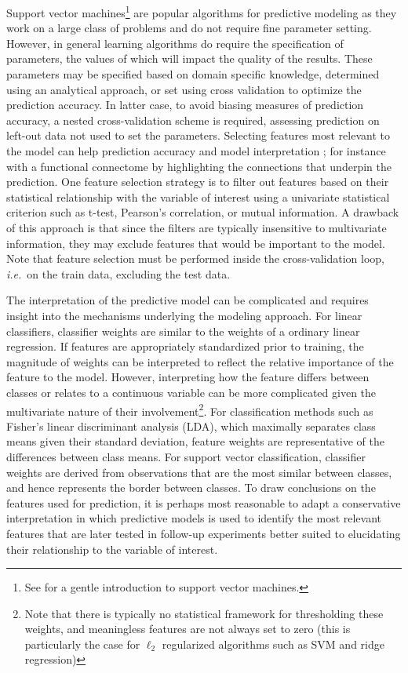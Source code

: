 \documentclass[5p]{elsarticle}
\begin{document}
Support vector machines\footnote{See \cite{kloppel2008}
for a gentle introduction to support vector machines.} are popular
algorithms for predictive modeling as they work on a large class of problems 
and do not require fine parameter setting.
However, in general learning algorithms do require the specification of
parameters, the values of which will impact the quality of the results.
These parameters may be specified based on domain specific knowledge,
determined using an analytical approach, or set using
cross validation to optimize the prediction accuracy. In latter case, 
to avoid biasing measures of prediction accuracy, a
nested cross-validation scheme \cite{pereira2009} is required, assessing 
prediction on left-out data not used to set the parameters.
%
Selecting features most relevant to the model can help prediction
accuracy and model interpretation \cite{pereira2009}; for instance with a
functional connectome by highlighting the connections that underpin the
prediction. One feature selection strategy is 
to filter out features
based on their statistical relationship with the variable of interest
using a univariate statistical criterion such as t-test, Pearson's
correlation, or mutual information.  A drawback of this approach is that
since the filters are typically insensitive to multivariate
information, they may exclude features that would be important to the
model. Note that feature selection must be performed inside the
cross-validation loop, \emph{i.e.}\ on the train data, excluding the test
data.


The interpretation of the predictive model can be complicated and
requires insight into the mechanisms
underlying the modeling approach. For linear classifiers, 
classifier weights are similar to the weights of a ordinary linear regression.
If features are appropriately
standardized prior to training, the magnitude of weights can be
interpreted to reflect the relative importance of the feature to the
model. However, interpreting how the feature differs between classes or
relates to a continuous variable can be more complicated given
the multivariate nature of their involvement\footnote{Note that there is
typically no statistical framework for thresholding these weights, and
meaningless features are not always set to zero (this is particularly the
case for $\ell_2$ regularized algorithms such as SVM and ridge
regression)}. For classification methods
such as Fisher's linear discriminant analysis (LDA), which maximally
separates class means given their standard deviation, feature weights are
representative of the differences between class means. For support vector
classification, classifier weights are derived from observations that are
the most similar between classes, and hence represents the border between
classes. To draw conclusions on the features used for prediction, it is
perhaps most reasonable to adapt a conservative interpretation in which
predictive models is used to identify the most relevant features that are
later tested in follow-up experiments better suited to elucidating their
relationship to the variable of interest.
\end{document}
